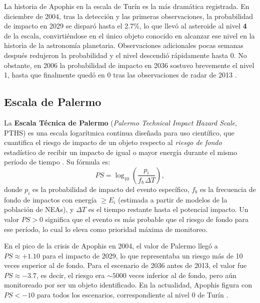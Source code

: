 \documentclass[a4paper]{article}
\begin{document}
La historia de Apophis en la escala de Turín es la más dramática registrada. En diciembre de 2004, tras la detección y las primeras observaciones, la probabilidad de impacto en 2029 se disparó hasta el 2.7\%, lo que llevó al asteroide al nivel \textbf{4} de la escala, convirtiéndose en el único objeto conocido en alcanzar ese nivel en la historia de la astronomía planetaria. Observaciones adicionales pocas semanas después redujeron la probabilidad y el nivel descendió rápidamente hasta 0. No obstante, en 2006 la probabilidad de impacto en 2036 sostuvo brevemente el nivel 1, hasta que finalmente quedó en 0 tras las observaciones de radar de 2013 \cite{binzel1999torino, nasa2025apophisfacts}.

\subsection{Escala de Palermo}

La \textbf{Escala Técnica de Palermo} (\textit{Palermo Technical Impact Hazard Scale}, PTHS) es una escala logarítmica continua diseñada para uso científico, que cuantifica el riesgo de impacto de un objeto respecto al \textit{riesgo de fondo} estadístico de recibir un impacto de igual o mayor energía durante el mismo período de tiempo \cite{chesley2002palermo}. Su fórmula es:
\begin{equation}
  PS = \log_{10}\!\left(\frac{p_i}{f_b \, \Delta T}\right),
\end{equation}
donde $p_i$ es la probabilidad de impacto del evento específico, $f_b$ es la frecuencia de fondo de impactos con energía $\geq E_i$ (estimada a partir de modelos de la población de NEAs), y $\Delta T$ es el tiempo restante hasta el potencial impacto. Un valor $PS > 0$ significa que el evento es más probable que el riesgo de fondo para ese período, lo cual lo eleva como prioridad máxima de monitoreo.

En el pico de la crisis de Apophis en 2004, el valor de Palermo llegó a $PS \approx +1.10$ para el impacto de 2029, lo que representaba un riesgo más de 10 veces superior al de fondo. Para el escenario de 2036 antes de 2013, el valor fue $PS \approx -3.7$, es decir, el riesgo era $\sim 5000$ veces inferior al de fondo, pero aún monitoreado por ser un objeto identificado. En la actualidad, Apophis figura con $PS < -10$ para todos los escenarios, correspondiente al nivel 0 de Turín \cite{nasa2025apophisfacts, farnocchia2023orbit}.

\end{document}
